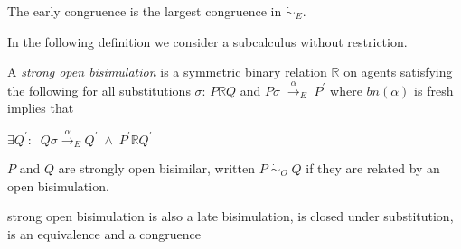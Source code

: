\begin{proposition}
  The early congruence is the largest congruence in $\dot{\sim}_{E}$.  
\end{proposition}

In the following definition we consider a subcalculus without restriction. 
\begin{definition}
  A \emph{strong open bisimulation} is a symmetric binary relation $\mathbb{R}$ on agents satisfying the following for all substitutions $\sigma$: $P\mathbb{R} Q$ and $P\sigma\; \xrightarrow{\alpha}_{E}\; P^{'}$ where $bn(\alpha)$ is fresh implies that
  \begin{center}
    $\exists Q^{'}:\;\; Q\sigma\xrightarrow{\alpha}_{E}Q^{'}\; \wedge\; P^{'}\mathbb{R}Q^{'}$
  \end{center}
  $P$ and $Q$ are strongly open bisimilar, written $P\; \dot{\sim}_{O}\; Q$ if they are related by an open bisimulation.
\end{definition}

\begin{proposition}
  strong open bisimulation is also a late bisimulation, is closed under substitution, is an equivalence and a congruence
\end{proposition}



